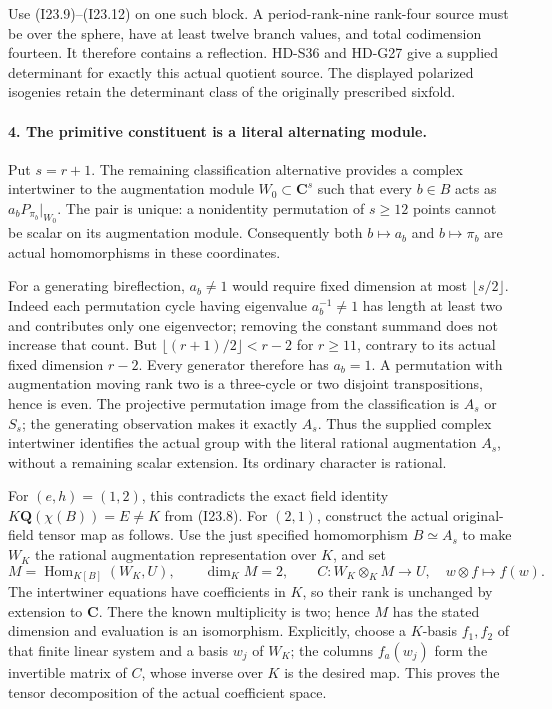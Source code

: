 Use (I23.9)--(I23.12) on one such block. A period-rank-nine
rank-four source must be over the sphere, have at least twelve
branch values, and total codimension fourteen. It therefore
contains a reflection. HD-S36 and HD-G27 give a supplied
determinant for exactly this actual quotient source. The
displayed polarized isogenies retain the determinant class
of the originally prescribed sixfold.

\paragraph{4. The primitive constituent is a literal alternating module.}
Put \(s=r+1\). The remaining classification alternative
provides a complex intertwiner to the augmentation module
\(W_0\subset\mathbf C^s\) such that every \(b\in B\)
acts as \(a_bP_{\pi_b}|_{W_0}\). The pair is unique:
a nonidentity permutation of \(s\ge12\) points cannot be
scalar on its augmentation module. Consequently both
\(b\mapsto a_b\) and \(b\mapsto\pi_b\) are actual
homomorphisms in these coordinates.

For a generating bireflection, \(a_b\ne1\) would require
fixed dimension at most \(\lfloor s/2\rfloor\). Indeed
each permutation cycle having eigenvalue \(a_b^{-1}\ne1\)
has length at least two and contributes only one eigenvector;
removing the constant summand does not increase that count.
But \(\lfloor(r+1)/2\rfloor<r-2\) for \(r\ge11\),
contrary to its actual fixed dimension \(r-2\). Every
generator therefore has \(a_b=1\). A permutation with
augmentation moving rank two is a three-cycle or two disjoint
transpositions, hence is even. The projective permutation
image from the classification is \(A_s\) or \(S_s\);
the generating observation makes it exactly \(A_s\).
Thus the supplied complex intertwiner identifies the actual
group with the literal rational augmentation \(A_s\),
without a remaining scalar extension. Its ordinary character
is rational.

For \((e,h)=(1,2)\), this contradicts the exact field
identity \(K\mathbf Q(\chi(B))=E\ne K\) from (I23.8).
For \((2,1)\), construct the actual original-field tensor
map as follows. Use the just specified homomorphism
\(B\simeq A_s\) to make \(W_K\) the rational augmentation
representation over \(K\), and set
\[
 M=\operatorname{Hom}_{K[B]}(W_K,U),\qquad
 \dim_KM=2,\qquad
 C:W_K\otimes_KM\longrightarrow U,\quad w\otimes f\mapsto f(w).
                                                               \tag{I25.4}
\]
The intertwiner equations have coefficients in \(K\), so
their rank is unchanged by extension to \(\mathbf C\).
There the known multiplicity is two; hence \(M\) has the
stated dimension and evaluation is an isomorphism. Explicitly,
choose a \(K\)-basis \(f_1,f_2\) of that finite linear
system and a basis \(w_j\) of \(W_K\); the columns
\(f_a(w_j)\) form the invertible matrix of \(C\), whose
inverse over \(K\) is the desired map. This proves the
tensor decomposition of the actual coefficient space.

